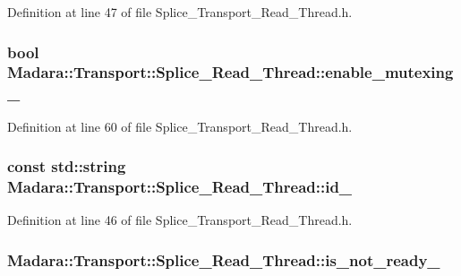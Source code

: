 Definition at line 47 of file Splice\_\-Transport\_\-Read\_\-Thread.h.

\hypertarget{classMadara_1_1Transport_1_1Splice__Read__Thread_ab8595b5547734b537d0cefa26a660777}{
\subsubsection[{enable\_\-mutexing\_\-}]{\setlength{\rightskip}{0pt plus 5cm}bool {\bf Madara::Transport::Splice\_\-Read\_\-Thread::enable\_\-mutexing\_\-}}}
\label{de/db7/classMadara_1_1Transport_1_1Splice__Read__Thread_ab8595b5547734b537d0cefa26a660777}


Definition at line 60 of file Splice\_\-Transport\_\-Read\_\-Thread.h.

\hypertarget{classMadara_1_1Transport_1_1Splice__Read__Thread_a2c04d64648061c72cb08113bf2d1c137}{
\subsubsection[{id\_\-}]{\setlength{\rightskip}{0pt plus 5cm}const std::string {\bf Madara::Transport::Splice\_\-Read\_\-Thread::id\_\-}}}
\label{de/db7/classMadara_1_1Transport_1_1Splice__Read__Thread_a2c04d64648061c72cb08113bf2d1c137}


Definition at line 46 of file Splice\_\-Transport\_\-Read\_\-Thread.h.

\hypertarget{classMadara_1_1Transport_1_1Splice__Read__Thread_af7a39070fa9019143d7971022c08be4a}{
\subsubsection[{is\_\-not\_\-ready\_\-}]{ {\bf Madara::Transport::Splice\_\-Read\_\-Thread::is\_\-not\_\-ready\_\-}}}
\label{de/db7/classMadara_1_1Transport_1_1Splice__Read__Thread_af7a39070fa9019143d7971022c08be4a}


